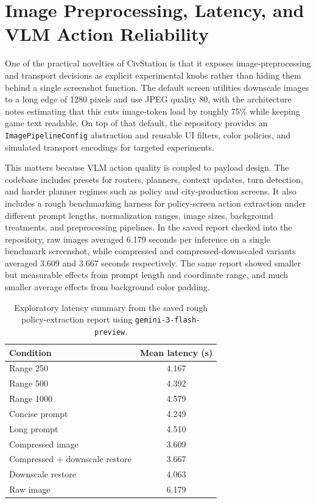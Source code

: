 \section{Image Preprocessing, Latency, and VLM Action Reliability}

One of the practical novelties of CivStation is that it exposes image-preprocessing and transport decisions as explicit experimental knobs rather than hiding them behind a single screenshot function. The default screen utilities downscale images to a long edge of 1280 pixels and use JPEG quality 80, with the architecture notes estimating that this cuts image-token load by roughly 75\% while keeping game text readable. On top of that default, the repository provides an \texttt{ImagePipelineConfig} abstraction and reusable UI filters, color policies, and simulated transport encodings for targeted experiments.

This matters because VLM action quality is coupled to payload design. The codebase includes presets for routers, planners, context updates, turn detection, and harder planner regimes such as policy and city-production screens. It also includes a rough benchmarking harness for policy-screen action extraction under different prompt lengths, normalization ranges, image sizes, background treatments, and preprocessing pipelines. In the saved report checked into the repository, raw images averaged 6.179 seconds per inference on a single benchmark screenshot, while compressed and compressed-downscaled variants averaged 3.609 and 3.667 seconds respectively. The same report showed smaller but measurable effects from prompt length and coordinate range, and much smaller average effects from background color padding.

\begin{table}[t]
\centering
\caption{Exploratory latency summary from the saved rough policy-extraction report using \texttt{gemini-3-flash-preview}.}
\label{tab:latency-tradeoffs}
\begin{tabular}{lc}
\toprule
\textbf{Condition} & \textbf{Mean latency (s)} \\
\midrule
Range 250 & 4.167 \\
Range 500 & 4.392 \\
Range 1000 & 4.579 \\
Concise prompt & 4.249 \\
Long prompt & 4.510 \\
Compressed image & 3.609 \\
Compressed + downscale restore & 3.667 \\
Downscale restore & 4.063 \\
Raw image & 6.179 \\
\bottomrule
\end{tabular}
\end{table}

